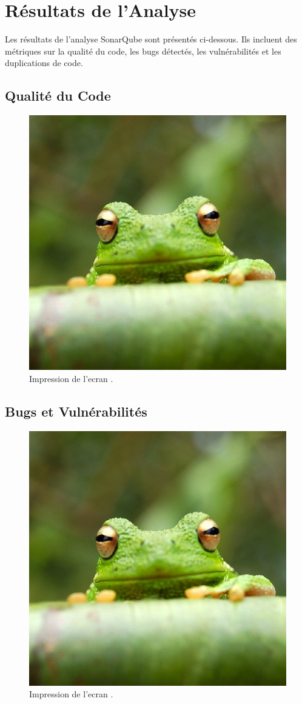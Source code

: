 \documentclass{article}
\begin{document}
\section{Résultats de l'Analyse}

Les résultats de l'analyse SonarQube sont présentés ci-dessous. Ils incluent des métriques sur la qualité du code, les bugs détectés, les vulnérabilités et les duplications de code.


\subsection{Qualité du Code}

  \begin{figure}[H]
    \centering
    \includegraphics[width=0.5\linewidth]{assets/frog.jpg}
    \caption{\label{fig:frog17} Impression de l'ecran .}
    \end{figure}
\subsection{Bugs et Vulnérabilités}

  \begin{figure}[H]
    \centering
    \includegraphics[width=0.5\linewidth]{assets/frog.jpg}
    \caption{\label{fig:frog18} Impression de l'ecran .}
    \end{figure}
\end{document}
